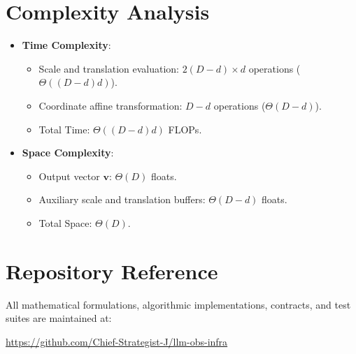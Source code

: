 \documentclass[11pt,a4paper]{article}
\theoremstyle{definition}
\begin{document}
\section{Complexity Analysis}
\begin{itemize}
    \item \textbf{Time Complexity}:
    \begin{itemize}
        \item Scale and translation evaluation: $2(D - d) \times d$ operations ($\Theta((D - d)d)$).
        \item Coordinate affine transformation: $D - d$ operations ($\Theta(D - d)$).
        \item Total Time: $\Theta((D - d)d)$ FLOPs.
    \end{itemize}
    \item \textbf{Space Complexity}:
    \begin{itemize}
        \item Output vector $\mathbf{v}$: $\Theta(D)$ floats.
        \item Auxiliary scale and translation buffers: $\Theta(D - d)$ floats.
        \item Total Space: $\Theta(D)$.
    \end{itemize}
\end{itemize}

\section{Repository Reference}
All mathematical formulations, algorithmic implementations, contracts, and test suites are maintained at:
\begin{center}
\url{https://github.com/Chief-Strategist-J/llm-obs-infra}
\end{center}
\end{document}
